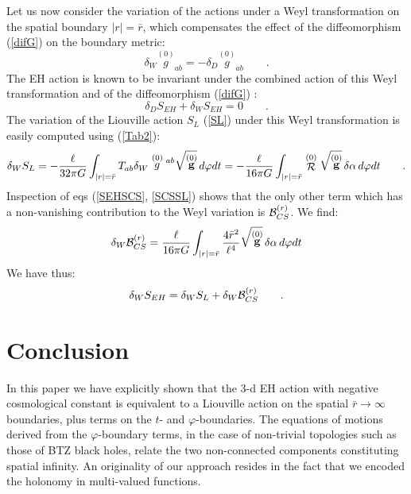 \documentclass[a4paper,10pt]{article}
\begin{document}
Let us now consider the variation of the actions under a Weyl transformation
on the spatial boundary $|r|=\bar r$,
which compensates the effect of the diffeomorphism (\ref{difG}) on
the boundary metric:
\begin{equation}
\delta _{W}\stackrel {(0)} g_{ab}= - \delta _{D}\stackrel {(0)} g_{ab}
\qquad .
\end{equation}
The EH action is known to be invariant under the combined action of this 
Weyl transformation and of the diffeomorphism (\ref{difG}) \cite{NB,BERS}:
\begin{equation}
\delta _{D} S_{EH} + \delta _{W} S_{EH} = 0 \qquad .
\end{equation}
The variation of the Liouville action $S_L$ (\ref{SL}) under this Weyl 
transformation is
easily computed using (\ref{Tab2}):
\begin{equation}
\delta_W S_{L}= - \frac \ell {32 \pi G}
\int_{|r|=\bar r} T_{ab} \delta_W \stackrel {(0)} g \strut^{ab}
\sqrt{\stackrel {(0)} {\bf g}} 
 \, d\varphi dt
= - \frac \ell {16 \pi G}\int_{|r|=\bar r}
\stackrel {(0)} {\cal R}
 \sqrt{\stackrel {(0)} {\bf g}} \, \delta \alpha
 \, d\varphi dt
\qquad . 
\end{equation}
Inspection of eqs (\ref{SEHSCS}, \ref{SCSSL}) 
shows that the only other term which 
has a non-vanishing contribution to the Weyl
variation is ${\cal B}_{CS}^{(r)}$.
We find:
\begin{equation}
\delta_W {\cal B}_{CS}^{(r)} = \frac \ell {16 \pi G} \int_{|r|=\bar r}
\frac {4 \bar r ^2} {\ell ^4} \sqrt{\stackrel {(0)} {\bf g}} \, \delta \alpha
 \, d\varphi dt
\end{equation}
We have thus:
\begin{equation}
\delta_W S_{EH}=\delta_W S_L + \delta_W {\cal B}_{CS}^{(r)} \qquad .
\end{equation}

\section{Conclusion}
In this paper we have explicitly shown that the 3-d EH action with
negative cosmological constant is equivalent to a Liouville action
on the spatial $\bar r \rightarrow \infty$ boundaries, plus terms on the
$t$- and $\varphi$-boundaries. The equations of motions derived
from the $\varphi$-boundary terms, in the case of non-trivial topologies
such as those of BTZ black holes,
relate the two non-connected components constituting spatial infinity.
An originality of our approach resides
in the fact that we encoded the holonomy in multi-valued functions.
\end{document}
